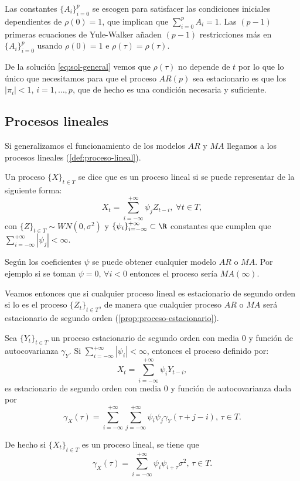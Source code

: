 Las constantes $\{A_i\}_{i = 0}^p$ se escogen para satisfacer las condiciones iniciales dependientes de $\rho(0) = 1$, que implican que $\sum_{i = 0}^p A_i = 1$. Las $(p - 1)$ primeras ecuaciones de Yule-Walker añaden $(p-1)$ restricciones más en $\{A_i\}_{i = 0}^p$ usando $\rho(0) = 1$ e $\rho(\tau) = \rho(\tau)$.

De la solución \eqref{eq:sol-general} vemos que $\rho(\tau)$ no depende de $t$ por lo que lo único que necesitamos para que el proceso $AR(p)$ sea estacionario es que los $|\pi_i| < 1$, $i = 1, \ldots, p$, que de hecho es una condición necesaria y suficiente.

\subsection{Procesos lineales}

Si generalizamos el funcionamiento de los modelos $AR$ y $MA$ llegamos a los procesos lineales (\autoref{def:proceso-lineal}).

\begin{definicion}
  Un proceso $\{X\}_{t \in T}$ se dice que es un proceso lineal si se puede representar de la siguiente forma:
  $$X_t = \sum \limits^{+\infty}_{i = -\infty} \psi_{j} Z_{t - i}, \; \forall t \in T,$$
  con $\{Z\}_{t \in T} \sim WN(0, \sigma^2)$ y $\{\psi_i\}^{+\infty}_{i = -\infty} \subset \R$ constantes que cumplen que $\sum \limits^{+\infty}_{i = -\infty} |\psi_j| < \infty$.
  \label{def:proceso-lineal}
\end{definicion}

Según los coeficientes $\psi$ se puede obtener cualquier modelo $AR$ o $MA$. Por ejemplo si se toman $\psi = 0, \, \forall i < 0$ entonces el proceso sería $MA(\infty)$.

Veamos entonces que si cualquier proceso lineal es estacionario de segundo orden si lo es el proceso $\{Z_t\}_{t \in T}$, de manera que cualquier proceso $AR$ o $MA$ será estacionario de segundo orden (\autoref{prop:proceso-estacionario}).

\begin{proposicion}
  Sea $\{Y_t\}_{t \in T}$ un proceso estacionario de segundo orden con media 0 y función de autocovarianza $\gamma_Y$. Si $\sum_{i = -\infty}^{+\infty} |\psi_i| < \infty$, entonces el proceso definido por:
  $$X_t = \sum \limits^{+\infty}_{i = -\infty} \psi_i Y_{t - i},$$
  es estacionario de segundo orden con media 0 y función de autocovarianza dada por
  $$\gamma_X(\tau)= \sum \limits^{+\infty}_{i=-\infty}\sum \limits^{+\infty}_{j = -\infty} \psi_i \psi_j \gamma_Y(\tau + j - i), \, \tau \in T.$$

  De hecho si $\{X_t\}_{t \in T}$ es un proceso lineal, se tiene que
  $$\gamma_X(\tau) = \sum \limits^{+\infty}_{i = -\infty} \psi_{i} \psi_{i + \tau}\sigma^2, \, \tau \in T.$$
  \label{prop:proceso-estacionario}
\end{proposicion}

